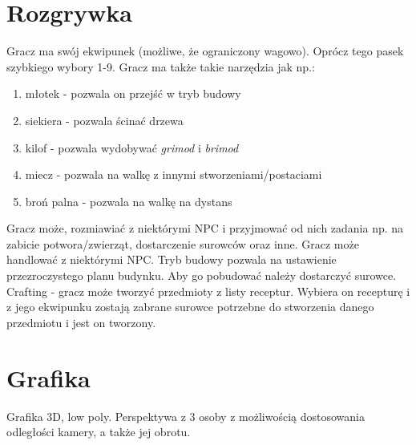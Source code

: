 \documentclass[12pt]{article}
\begin{document}
	\section{Rozgrywka}
	Gracz ma swój ekwipunek (możliwe, że ograniczony wagowo). Oprócz tego pasek szybkiego wybory 1-9.\newline\newline
	Gracz ma także takie narzędzia jak np.:
	\begin{enumerate}
		\item młotek - pozwala on przejść w tryb budowy
		\item siekiera - pozwala ścinać drzewa
		\item kilof - pozwala wydobywać \textit{grimod} i \textit{brimod}
		\item miecz - pozwala na walkę z innymi stworzeniami/postaciami
		\item broń palna - pozwala na walkę na dystans
	\end{enumerate}
	Gracz może, rozmiawiać z niektórymi NPC i przyjmować od nich zadania np. na zabicie potwora/zwierząt, dostarczenie surowców oraz inne.\newline\newline
	Gracz może handlować z niektórymi NPC.
	\newline\newline
	Tryb budowy pozwala na ustawienie przezroczystego planu budynku. Aby go pobudować należy dostarczyć surowce.
	\newline\newline
	Crafting - gracz może tworzyć przedmioty z listy receptur. Wybiera on recepturę i z jego ekwipunku zostają zabrane surowce potrzebne do stworzenia danego przedmiotu i jest on tworzony.
	\section{Grafika}
	Grafika 3D, low poly. Perspektywa z 3 osoby z możliwością dostosowania odległości kamery, a także jej obrotu.
\end{document}
